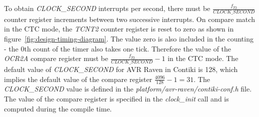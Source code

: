 To obtain {\it{CLOCK\_SECOND}} interrupts per second, there must be
${\frac{f_{T2}}{CLOCK\_SECOND}}$ counter register increments between two successive interrupts.
On compare match in the CTC mode, the {\it{TCNT2}} counter register is reset to zero as
shown in figure~\ref{fig:design-timing-diagram}.
The value zero is also included in the counting - the 0th count of the timer also takes one tick.
Therefore the value of the {\it{OCR2A}} compare register must be ${\frac{f_{T2}}{CLOCK\_SECOND}} - 1$
in the CTC mode.
The default value of {\it{CLOCK\_SECOND}} for AVR Raven in Contiki is 128,
which implies the default value of the compare register ${\frac{4096}{128}} - 1 = 31$.
The {\it{CLOCK\_SECOND}} value is defined in the {\it{platform/avr-raven/contiki-conf.h}} file.
The value of the compare register is specified in the {\it{clock\_init}} call
and is computed during the compile time.
